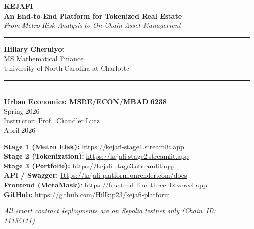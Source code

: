 \documentclass[11pt,letterpaper]{article}
\begin{document}
\begin{titlepage}
  \centering
  \vspace*{1.5cm}

  {\Huge\bfseries\color{kejafi} KEJAFI}\\[0.3cm]
  {\Large\bfseries\color{kejafiDark} An End-to-End Platform for Tokenized Real Estate}\\[0.3cm]
  {\large\color{darkgray}\itshape From Metro Risk Analysis to On-Chain Asset Management}

  \vspace{1.2cm}
  {\color{kejafi}\rule{0.6\textwidth}{1.5pt}}
  \vspace{1.2cm}

  {\large\textbf{Hillary Cheruiyot}}\\[0.2cm]
  {\normalsize MS Mathematical Finance\\[0.1cm]
  University of North Carolina at Charlotte}\\[0.4cm]

  {\color{darkgray}\rule{0.4\textwidth}{0.5pt}}\\[0.4cm]

  {\normalsize \textbf{Urban Economics: MSRE/ECON/MBAD 6238}\\[0.1cm]
  Spring 2026\\[0.1cm]
  Instructor: Prof.\ Chandler Lutz}\\[0.4cm]

  {\normalsize April 2026}

  \vfill

  \begin{tcolorbox}[
    colback=lightgray,
    colframe=kejafiDark,
    width=0.85\textwidth,
    arc=4pt,
    title={\textbf{\color{white}Platform Access}},
    coltitle=white,
    colbacktitle=kejafiDark,
    fontupper=\small
  ]
  \textbf{Stage 1 (Metro Risk):} \url{https://kejafi-stage1.streamlit.app}\\
  \textbf{Stage 2 (Tokenization):} \url{https://kejafi-stage2.streamlit.app}\\
  \textbf{Stage 3 (Portfolio):} \url{https://kejafi-stage3.streamlit.app}\\
  \textbf{API / Swagger:} \url{https://kejafi-platform.onrender.com/docs}\\
  \textbf{Frontend (MetaMask):} \url{https://frontend-lilac-three-92.vercel.app}\\
  \textbf{GitHub:} \url{https://github.com/Hillkip23/kejafi-platform}
  \end{tcolorbox}

  \vspace{0.4cm}
  {\small\color{darkgray}\itshape
  All smart contract deployments are on Sepolia testnet only (Chain~ID: 11155111).}
\end{titlepage}
\end{document}
